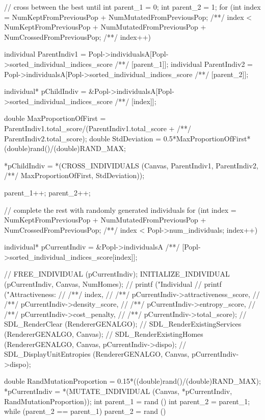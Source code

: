 \begin{C}
{	// cross between the best until
	int parent_1 = 0;
	int parent_2 = 1;
	for (int index = NumKeptFromPreviousPop + NumMutatedFromPreviousPop;
	/**/ index < NumKeptFromPreviousPop + NumMutatedFromPreviousPop + NumCrossedFromPreviousPop;
	/**/ index++){
		
		individual ParentIndiv1 = Popl->individualsA[Popl->sorted_individual_indices_score
		/**/ [parent_1]];
		individual ParentIndiv2 = Popl->individualsA[Popl->sorted_individual_indices_score
		/**/ [parent_2]];
		
		individual* pChildIndiv = &Popl->individualsA[Popl->sorted_individual_indices_score
		/**/ [index]];
		
		double MaxProportionOfFirst = ParentIndiv1.total_score/(ParentIndiv1.total_score +
		/**/ ParentIndiv2.total_score);
		double StdDeviation = 0.5*MaxProportionOfFirst*(double)rand()/(double)RAND_MAX;
		
		*pChildIndiv = *(CROSS_INDIVIDUALS (Canvas, ParentIndiv1, ParentIndiv2,
		/**/ MaxProportionOfFirst, StdDeviation));
		
		parent_1++;
		parent_2++;
	}
	
	// complete the rest with randomly generated individuals
	for (int index = NumKeptFromPreviousPop + NumMutatedFromPreviousPop + NumCrossedFromPreviousPop;
	/**/ index < Popl->num_individuals; index++){
		
		individual* pCurrentIndiv = &Popl->individualsA
		/**/ [Popl->sorted_individual_indices_score[index]];
		
		// FREE_INDIVIDUAL (pCurrentIndiv);
		INITIALIZE_INDIVIDUAL (pCurrentIndiv, Canvas, NumHomes);
		// printf ("Individual %
		// printf ("Attractiveness: %
		// /**/ index,
		// /**/ pCurrentIndiv->attractiveness_score,
		// /**/ pCurrentIndiv->density_score,
		// /**/ pCurrentIndiv->entropy_score,
		// /**/ pCurrentIndiv->cost_penalty,
		// /**/ pCurrentIndiv->total_score);
		// SDL_RenderClear (RendererGENALGO);
		// SDL_RenderExistingServices (RendererGENALGO, Canvas);
		// SDL_RenderExistingHomes (RendererGENALGO, Canvas, pCurrentIndiv->dispo);
		// SDL_DisplayUnitEntropies (RendererGENALGO, Canvas, pCurrentIndiv->dispo);
		
		double RandMutationProportion = 0.15*((double)rand()/(double)RAND_MAX);
		*pCurrentIndiv = *(MUTATE_INDIVIDUAL (Canvas, *pCurrentIndiv, RandMutationProportion));
		int parent_1 = rand () %
		int parent_2 = parent_1;
		while (parent_2 == parent_1)
		parent_2 = rand () %
		
}}
\end{C}
